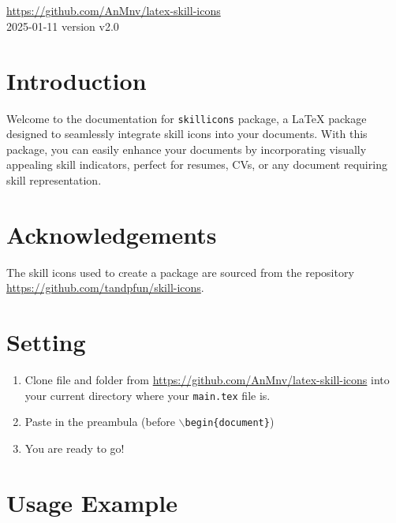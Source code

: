 \documentclass[12pt]{article}
\begin{document}
\begin{center}
\fontsize{40}{50} \\[1cm]  \\[1cm]
 
\Large \href{https://github.com/AnMnv/latex-skill-icons}{https://github.com/AnMnv/latex-skill-icons}\\[1cm]

2025-01-11 version v2.0 
\end{center}


\vspace*{2cm}


\section*{Introduction}
Welcome to the documentation for \texttt{skillicons} package, a LaTeX package designed to seamlessly integrate skill icons into your documents. With this package, you can easily enhance your documents by incorporating visually appealing skill indicators, perfect for resumes, CVs, or any document requiring skill representation.


 
\section*{Acknowledgements}
The skill icons used to create a package are sourced from the repository \href{https://github.com/tandpfun/skill-icons}{https://github.com/tandpfun/skill-icons}.

\section*{Setting}
\begin{enumerate}
\item Clone  file and  folder from \href{https://github.com/AnMnv/latex-skill-icons}{https://github.com/AnMnv/latex-skill-icons} into your current directory where your \texttt{main.tex} file is.
\item Paste  in the preambula (before \texttt{$\backslash$begin\{document\}})
\item You are ready to go!
\end{enumerate}

\section*{Usage Example}
\end{document}
